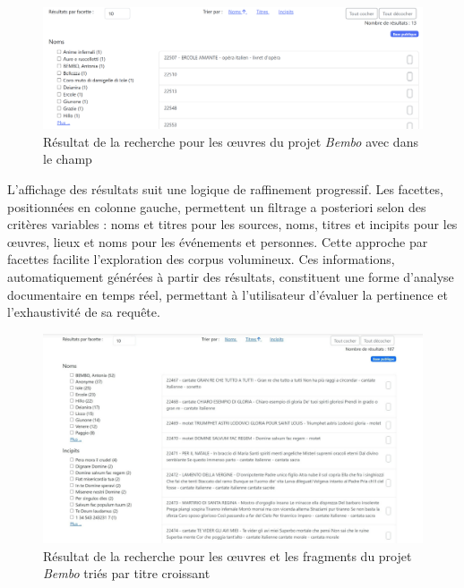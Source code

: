 \begin{figure}[h]
	\caption{Résultat de la recherche pour les œuvres du projet \textit{Bembo} avec  dans le champ } \label{resultat_ercole}
	\centering
	\includegraphics[width=\textwidth]{images/Capture_ecran_resultats_sans_titre.png}
\end{figure}

L'affichage des résultats suit une logique de raffinement progressif. Les facettes, positionnées en colonne gauche, permettent un filtrage a posteriori selon des critères variables : noms et titres pour les sources, noms, titres et incipits pour les œuvres, lieux et noms pour les événements et personnes. Cette approche par facettes facilite l'exploration des corpus volumineux. Ces informations, automatiquement générées à partir des résultats, constituent une forme d'analyse documentaire en temps réel, permettant à l'utilisateur d'évaluer la pertinence et l'exhaustivité de sa requête.

\begin{figure}[h]
	\caption{Résultat de la recherche pour les œuvres et les fragments du projet \textit{Bembo} triés par titre croissant} \label{resultat_bembo}
	\centering
	\includegraphics[width=\textwidth]{images/Capture_ecran_resultat_bembo_avec_frag_titre_croissant.jpeg}
\end{figure}

